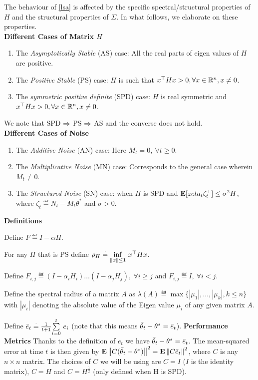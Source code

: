 The behaviour of \eqref{lsa} is affected by the specific spectral/structural properties of $H$ and the structural properties of $\Sigma$.
In what follows, we elaborate on these properties.\\
\textbf{Different Cases of Matrix $H$}
\begin{enumerate}[label=(\roman*)]
\item The \emph{Asymptotically Stable} (AS) case: All the real parts of eigen values of $H$ are positive.
\item The \emph{Positive Stable} (PS) case: $H$ is such that $x^\top H x>0, \forall x\in \R^n,x\neq 0$.
\item The \emph{symmetric positive definite} (SPD) case: $H$ is real symmetric and $x^\top Hx>0, \forall x\in \R^n, x\neq 0$.
\end{enumerate}
We note that SPD $\Ra$ PS $\Ra$ AS and the converse does not hold.\\
\textbf{Different Cases of Noise}
\begin{enumerate}[label=(\roman*)]
\item The \emph{Additive Noise} (AN) case: Here $M_t=0, ~\forall t\geq 0$.
\item The \emph{Multiplicative Noise} (MN) case: Corresponds to the general case wherein $M_t\neq 0$.
\item The \emph{Structured Noise} (SN) case: when $H$ is SPD and $\E[zeta_t\zeta_t^\top]\leq \sigma^2 H$, where $\zeta_t\eqdef N_t-M_t\theta^*$ and $\sigma>0$.
\end{enumerate}
\textbf{Definitions}
\ber
\item Define $F\eqdef I-\alpha H$.
\item For any $H$ that is PS define $\rho_H \eqdef \us{\inf}{\norm{x}\leq 1 } x^\top H x$.
\item Define $F_{i,j}\eqdef (I-\alpha_i H_i)\ldots (I-\alpha_j H_j),~\forall i\geq j$ and $F_{i,j}\eqdef I,~\forall i<j$.
\item Define the spectral radius of a matrix $A$ as $\lambda(A) \eqdef \max\{|\mu_1|,\ldots,|\mu_k|,k\leq n\}$ with $|\mu_i|$ denoting the absolute value of the Eigen value $\mu_i$ of any given matrix $A$.
\item Define $\eb_t\eqdef\frac{1}{t+1}\ous{\sum}{i=0}{t} e_i$ (note that this means $\tb_t-\ts=\eb_t$).
\eer
\textbf{Performance Metrics} Thanks to the definition of  $e_t$ we have $\tb_t-\ts=\eb_t$. The mean-squared error at time $t$ is then given by $\E\norm{C(\tb_t-\ts)}^2=\E\norm{C\eb_t}^2$, where $C$ is any $n\times n$ matrix. The choices of $C$ we will be using are $C=I$ ($I$ is the identity matrix), $C=H$ and $C=H^{\frac{1}{2}}$ (only defined when H is SPD).\par


